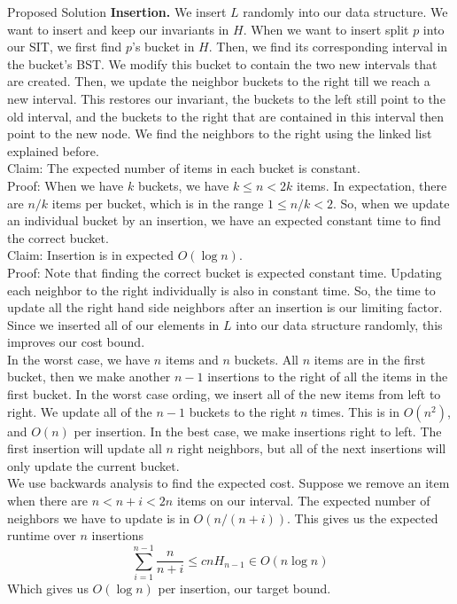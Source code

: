 \documentclass[11pt]{article}
\begin{document}
\begin{section}{Proposed Solution}
\textbf{Insertion.} We insert $L$ randomly into our data structure. We want to insert and keep our invariants in $H$. When we want to insert split $p$ into our SIT, we first find $p$'s bucket in $H$. Then, we find its corresponding interval in the bucket's BST. We modify this bucket to contain the two new intervals that are created. Then, we update the neighbor buckets to the right till we reach a new interval. This restores our invariant, the buckets to the left still point to the old interval, and the buckets to the right that are contained in this interval then point to the new node. We find the neighbors to the right using the linked list explained before.\\

Claim: The expected number of items in each bucket is constant.\\
Proof: When we have $k$ buckets, we have $k \le n < 2k$ items. In expectation, there are $n / k$ items per bucket, which is in the range $1 \le n/k < 2$. So, when we update an individual bucket by an insertion, we have an expected constant time to find the correct bucket.\\

Claim: Insertion is in expected $O(\log n)$. \\
Proof: Note that finding the correct bucket is expected constant time. Updating each neighbor to the right individually is also in constant time. So, the time to update all the right hand side neighbors after an insertion is our limiting factor. Since we inserted all of our elements in $L$ into our data structure randomly, this improves our cost bound. \\

In the worst case, we have $n$ items and $n$ buckets. All $n$ items are in the first bucket, then we make another $n-1$ insertions to the right of all the items in the first bucket. In the worst case ording, we insert all of the new items from left to right. We update all of the $n-1$ buckets to the right $n$ times. This is in $O(n^2)$, and $O(n)$ per insertion. In the best case, we make insertions right to left. The first insertion will update all $n$ right neighbors, but all of the next insertions will only update the current bucket.\\

We use backwards analysis to find the expected cost. Suppose we remove an item when there are $n < n + i < 2n$ items on our interval. The expected number of neighbors we have to update is in $O(n/(n+i))$.
This gives us the expected runtime over $n$ insertions
\[\sum_{i=1}^{n-1}\frac{n}{n+i} \le c n H_{n-1} \in O(n \log n)\]
Which gives us $O(\log n)$ per insertion, our target bound.


\end{section}
\end{document}
